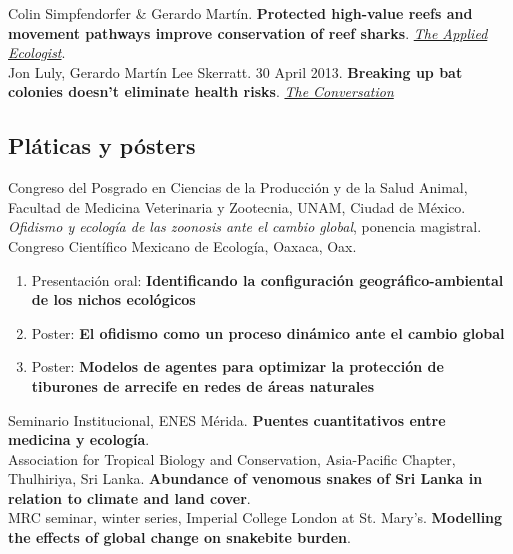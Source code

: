 \documentclass[11pt, letter]{article}
\newcommand{\years}[1]{\marginnote{\scriptsize #1}}
\begin{document}
\years{2020} Colin Simpfendorfer \& Gerardo Mart\'in. \textbf{Protected high-value reefs and movement pathways improve conservation of reef sharks}. \href{https://appliedecologistsblog.com/2020/07/30/protected-high-value-reefs-and-movement-pathways-improve-conservation-of-reef-sharks/}{\emph{The Applied Ecologist}}.\\

\years{2013} Jon Luly, Gerardo Mart\'in Lee Skerratt. 30 April 2013. \textbf{Breaking up bat colonies doesn't eliminate health risks}. \href{http://theconversation.com/breaking-up-bat-colonies-doesnt-eliminate-health-risks-13580}{\emph{The Conversation}}


\subsection*{Pl\'aticas y p\'osters}

\years{2022} Congreso del Posgrado en Ciencias de la Producción y de la Salud Animal, Facultad de Medicina Veterinaria y Zootecnia, UNAM, Ciudad de México. \emph{Ofidismo y ecología de las zoonosis ante el cambio global}, ponencia magistral.\\

\years{2022} Congreso Científico Mexicano de Ecología, Oaxaca, Oax.

\begin{enumerate}
	\item Presentación oral: \textbf{Identificando la configuración geográfico-ambiental de los nichos ecológicos}
	\item Poster: \textbf{El ofidismo como un proceso dinámico ante el cambio global}
	\item Poster: \textbf{Modelos de agentes para optimizar la protección de tiburones de arrecife en redes de áreas naturales}
\end{enumerate}

\years{2020} Seminario Institucional, ENES Mérida. \textbf{Puentes cuantitativos entre medicina y ecología}. \\

\years{2019} Association for Tropical Biology and Conservation, Asia-Pacific Chapter, Thulhiriya, Sri Lanka. \textbf{Abundance of venomous snakes of Sri Lanka in relation to climate and land cover}.\\

\years{2019} MRC seminar, winter series, Imperial College London at St. Mary's. \textbf{Modelling the effects of global change on snakebite burden}.\\
\end{document}
